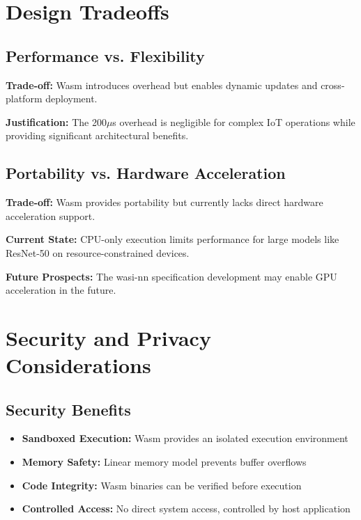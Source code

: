 \documentclass[11pt]{article}
\begin{document}
\section{Design Tradeoffs}

\subsection{Performance vs. Flexibility}

\textbf{Trade-off:} Wasm introduces overhead but enables dynamic updates and cross-platform deployment.

\textbf{Justification:} The 200$\mu$s overhead is negligible for complex IoT operations while providing significant architectural benefits.

\subsection{Portability vs. Hardware Acceleration}

\textbf{Trade-off:} Wasm provides portability but currently lacks direct hardware acceleration support.

\textbf{Current State:} CPU-only execution limits performance for large models like ResNet-50 on resource-constrained devices.

\textbf{Future Prospects:} The wasi-nn specification development may enable GPU acceleration in the future.

\section{Security and Privacy Considerations}

\subsection{Security Benefits}

\begin{itemize}
\item \textbf{Sandboxed Execution:} Wasm provides an isolated execution environment
\item \textbf{Memory Safety:} Linear memory model prevents buffer overflows
\item \textbf{Code Integrity:} Wasm binaries can be verified before execution
\item \textbf{Controlled Access:} No direct system access, controlled by host application
\end{itemize}
\end{document}
